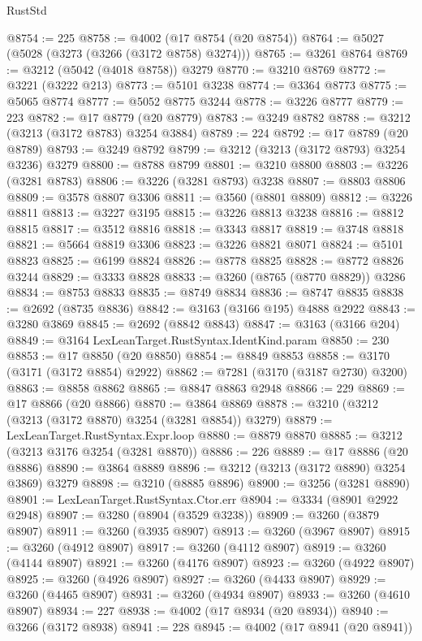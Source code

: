 \begin{lexlean}{RustStd}
\begin{coremodule}
{\begin{coremodule}
{{{{{{{{{{{{{{{{{{{{{{{{{{@8754 := 225
@8758 := @4002 (@17 @8754 (@20 @8754))
@8764 := @5027 (@5028 (@3273 (@3266 (@3172 @8758) @3274)))
@8765 := @3261 @8764
@8769 := @3212 (@5042 (@4018 @8758)) @3279
@8770 := @3210 @8769
@8772 := @3221 (@3222 @213)
@8773 := @5101 @3238
@8774 := @3364 @8773
@8775 := @5065 @8774
@8777 := @5052 @8775 @3244
@8778 := @3226 @8777
@8779 := 223
@8782 := @17 @8779 (@20 @8779)
@8783 := @3249 @8782
@8788 := @3212 (@3213 (@3172 @8783) @3254 @3884)
@8789 := 224
@8792 := @17 @8789 (@20 @8789)
@8793 := @3249 @8792
@8799 := @3212 (@3213 (@3172 @8793) @3254 @3236) @3279
@8800 := @8788 @8799
@8801 := @3210 @8800
@8803 := @3226 (@3281 @8783)
@8806 := @3226 (@3281 @8793) @3238
@8807 := @8803 @8806
@8809 := @3578 @8807 @3306
@8811 := @3560 (@8801 @8809)
@8812 := @3226 @8811
@8813 := @3227 @3195
@8815 := @3226 @8813 @3238
@8816 := @8812 @8815
@8817 := @3512 @8816
@8818 := @3343 @8817
@8819 := @3748 @8818
@8821 := @5664 @8819 @3306
@8823 := @3226 @8821 @8071
@8824 := @5101 @8823
@8825 := @6199 @8824
@8826 := @8778 @8825
@8828 := @8772 @8826 @3244
@8829 := @3333 @8828
@8833 := @3260 (@8765 (@8770 @8829)) @3286
@8834 := @8753 @8833
@8835 := @8749 @8834
@8836 := @8747 @8835
@8838 := @2692 (@8735 @8836)
@8842 := @3163 (@3166 @195) @4888 @2922
@8843 := @3280 @3869
@8845 := @2692 (@8842 @8843)
@8847 := @3163 (@3166 @204)
@8849 := @3164 LexLeanTarget.RustSyntax.IdentKind.param
@8850 := 230
@8853 := @17 @8850 (@20 @8850)
@8854 := @8849 @8853
@8858 := @3170 (@3171 (@3172 @8854) @2922)
@8862 := @7281 (@3170 (@3187 @2730) @3200)
@8863 := @8858 @8862
@8865 := @8847 @8863 @2948
@8866 := 229
@8869 := @17 @8866 (@20 @8866)
@8870 := @3864 @8869
@8878 := @3210 (@3212 (@3213 (@3172 @8870) @3254 (@3281 @8854)) @3279)
@8879 := LexLeanTarget.RustSyntax.Expr.loop
@8880 := @8879 @8870
@8885 := @3212 (@3213 @3176 @3254 (@3281 @8870))
@8886 := 226
@8889 := @17 @8886 (@20 @8886)
@8890 := @3864 @8889
@8896 := @3212 (@3213 (@3172 @8890) @3254 @3869) @3279
@8898 := @3210 (@8885 @8896)
@8900 := @3256 (@3281 @8890)
@8901 := LexLeanTarget.RustSyntax.Ctor.err
@8904 := @3334 (@8901 @2922 @2948)
@8907 := @3280 (@8904 (@3529 @3238))
@8909 := @3260 (@3879 @8907)
@8911 := @3260 (@3935 @8907)
@8913 := @3260 (@3967 @8907)
@8915 := @3260 (@4912 @8907)
@8917 := @3260 (@4112 @8907)
@8919 := @3260 (@4144 @8907)
@8921 := @3260 (@4176 @8907)
@8923 := @3260 (@4922 @8907)
@8925 := @3260 (@4926 @8907)
@8927 := @3260 (@4433 @8907)
@8929 := @3260 (@4465 @8907)
@8931 := @3260 (@4934 @8907)
@8933 := @3260 (@4610 @8907)
@8934 := 227
@8938 := @4002 (@17 @8934 (@20 @8934))
@8940 := @3266 (@3172 @8938)
@8941 := 228
@8945 := @4002 (@17 @8941 (@20 @8941))
}}}}}}}}}}}}}}}}}}}}}}}}}}
\end{coremodule}}
\end{coremodule}
\end{lexlean}
